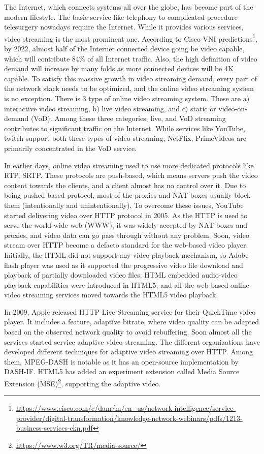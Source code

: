 The Internet, which connects systems all over the globe, has become part of the modern lifestyle. The basic service like telephony to complicated procedure telesurgery nowadays require the Internet. While it provides various services, video streaming is the most prominent one. According to Cisco VNI predictions\footnote{\url{https://www.cisco.com/c/dam/m/en_us/network-intelligence/service-provider/digital-transformation/knowledge-network-webinars/pdfs/1213-business-services-ckn.pdf}}, by 2022, almost half of the Internet connected device going be video capable, which will contribute 84\% of all Internet traffic. Also, the high definition of video demand will increase by many folds as more connected devices will be 4K capable. To satisfy this massive growth in video streaming demand, every part of the network stack needs to be optimized, and the online video streaming system is no exception. There is 3 type of online video streaming system. These are a) interactive video streaming, b) live video streaming, and c) static or video-on-demand (VoD). Among these three categories, live, and VoD streaming contributes to significant traffic on the Internet. While services like YouTube, twitch support both these types of video streaming, NetFlix, PrimeVideos are primarily concentrated in the VoD service. 

In earlier days, online video streaming used to use more dedicated protocols like RTP, SRTP. These protocols are push-based, which means servers push the video content towards the clients, and a client almost has no control over it. Due to being pushed based protocol, most of the proxies and NAT boxes usually block them (intentionally and unintentionally). To overcome these issues, YouTube started delivering video over HTTP protocol in 2005. As the HTTP is used to serve the world-wide-web (WWW), it was widely accepted by NAT boxes and proxies, and video data can go pass through without any problem. Soon, video stream over HTTP become a defacto standard for the web-based video player. Initially, the HTML did not support any video playback mechanism, so Adobe flash player was used as it supported the progressive video file download and playback of partially downloaded video files\cite{gill2007youtube}. HTML embedded audio-video playback capabilities were introduced in HTML5, and all the web-based online video streaming services moved towards the HTML5 video playback.

In 2009, Apple released HTTP Live Streaming service for their QuickTime video player. It includes a feature, adaptive bitrate, where video quality can be adapted based on the observed network quality to avoid rebuffering. Soon almost all the services started service adaptive video streaming. The different organizations have developed different techniques for adaptive video streaming over HTTP. Among them, MPEG-DASH\cite{ISO/IEC23009-1:2019} is notable as it has an open-source implementation by DASH-IF. HTML5 has added an experiment extension called Media Source Extension (MSE)\footnote{\url{https://www.w3.org/TR/media-source/}}, supporting the adaptive video. 

